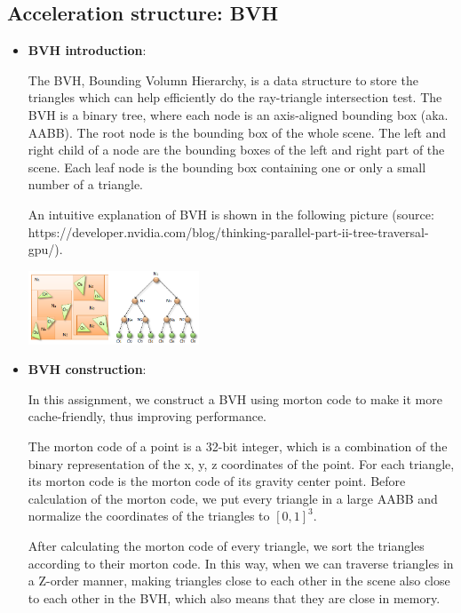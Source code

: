 \documentclass[acmtog]{acmart}
\begin{document}
\subsection{Acceleration structure: BVH}

\begin{itemize}
	\item \textbf{BVH introduction}:


The BVH, Bounding Volumn Hierarchy, is a data structure to store the triangles which can help efficiently do the ray-triangle intersection test. 
The BVH is a binary tree, where each node is an axis-aligned bounding box (aka. AABB). 
The root node is the bounding box of the whole scene. 
The left and right child of a node are the bounding boxes of the left and right part of the scene. 
Each leaf node is the bounding box containing one or only a small number of a triangle. 

An intuitive explanation of BVH is shown in the following picture (source: https://developer.nvidia.com/blog/thinking-parallel-part-ii-tree-traversal-gpu/).

\begin{center}
	\includegraphics[width=0.4\textwidth]{pictures/bvh.png}
\end{center}

	\item \textbf{BVH construction}:

In this assignment, we construct a BVH using morton code to make it more cache-friendly, thus improving performance. 

The morton code of a point is a 32-bit integer, which is a combination of the binary representation of the x, y, z coordinates of the point. For each triangle, its morton code is the morton code of its gravity center point. 
Before calculation of the morton code, we put every triangle in a large AABB and normalize the coordinates of the triangles to $[0, 1]^3$. 



After calculating the morton code of every triangle, we sort the triangles according to their morton code. 
In this way, when we can traverse triangles in a Z-order manner, making triangles close to each other in the scene also close to each other in the BVH, which also means that they are close in memory. 


\end{itemize}
\end{document}
